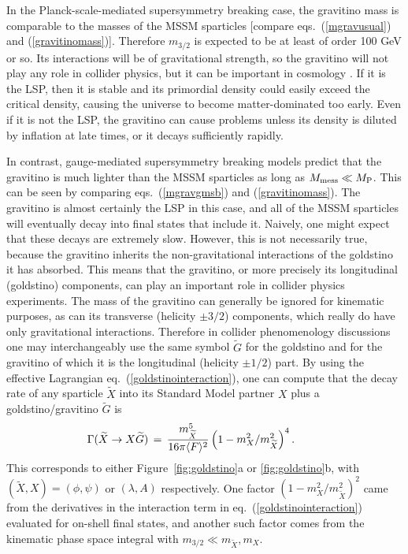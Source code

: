 \documentclass[11pt]{article}
\def\beq{\begin{eqnarray}}
\def\eeq{\end{eqnarray}}
\def\stilde{\widetilde}
\def\MPlanck{M_{\rm P}}
\begin{document}
In the Planck-scale-mediated supersymmetry breaking case, the gravitino 
mass is comparable to the masses of the MSSM sparticles [compare 
eqs.~(\ref{mgravusual}) and (\ref{gravitinomass})]. Therefore $m_{3/2}$ is 
expected to be at least of order 100 GeV or so. Its interactions will be 
of gravitational strength, so the gravitino will not play any role in 
collider physics, but it can be important in cosmology 
\cite{cosmogravitino}. If it is the LSP, then it is stable and its 
primordial density could easily exceed the critical density, causing the 
universe to become matter-dominated too early. Even if it is not the LSP, 
the gravitino can cause problems unless its density is diluted by 
inflation at late times, or it decays sufficiently rapidly.

In contrast, gauge-mediated supersymmetry breaking models predict that the 
gravitino is much lighter than the MSSM sparticles as long as $M_{\rm 
mess} \ll \MPlanck$. This can be seen by comparing eqs.~(\ref{mgravgmsb}) 
and (\ref{gravitinomass}). The gravitino is almost certainly the LSP in 
this case, and all of the MSSM sparticles will eventually decay into final 
states that include it. Naively, one might expect that these decays are 
extremely slow. However, this is not necessarily true, because the 
gravitino inherits the non-gravitational interactions of the goldstino it 
has absorbed. This means that the gravitino, or more precisely its 
longitudinal (goldstino) components, can play an important role in 
collider physics experiments. The mass of the gravitino can generally be 
ignored for kinematic purposes, as can its transverse (helicity $\pm 3/2$) 
components, which really do have only gravitational interactions. 
Therefore in collider phenomenology discussions one may interchangeably 
use the same symbol $\stilde G$ for the goldstino and for the gravitino of 
which it is the longitudinal (helicity $\pm 1/2$) part. By using the 
effective Lagrangian eq.~(\ref{goldstinointeraction}), one can compute 
that the decay rate of any sparticle $\stilde X$ into its Standard Model 
partner $X$ plus a goldstino/gravitino $\stilde G$ is 
\beq
\Gamma(\stilde X \rightarrow X\stilde G) \,=\,
{m^5_{\stilde X} \over 16 \pi \langle F \rangle^2}
\left ( 1 - {m_X^2/ m_{\stilde X}^2} \right )^4 .
\qquad\>\>{}
\label{generalgravdecay}
\eeq
This corresponds to either Figure~\ref{fig:goldstino}a or 
\ref{fig:goldstino}b, with $(\stilde X,X) = (\phi,\psi)$ or $(\lambda,A)$ 
respectively. One factor $(1 - m_X^2/m_{\stilde X}^2 )^2$ came from the 
derivatives in the interaction term in eq.~(\ref{goldstinointeraction}) 
evaluated for on-shell final states, and another such factor comes from 
the kinematic phase space integral with $m_{3/2} \ll m_{\stilde X}, m_X$.
\end{document}

